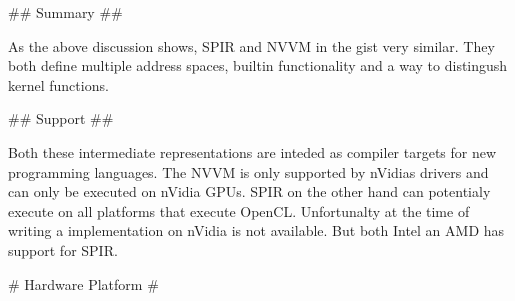\begin{markdown}
## Summary ## 

As the above discussion shows, SPIR and NVVM in the gist very
similar. They both define multiple address spaces, builtin
functionality and a way to distingush kernel functions.

## Support ##

Both these intermediate representations are inteded as compiler
targets for new programming languages. The NVVM is only supported by
nVidias drivers and can only be executed on nVidia GPUs. SPIR on the
other hand can potentialy execute on all platforms that execute
OpenCL. Unfortunalty at the time of writing a implementation on nVidia
is not available. But both Intel an AMD has support for SPIR.

# Hardware Platform #
\end{markdown}
